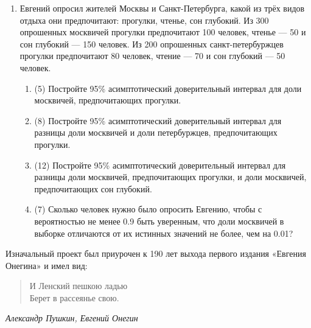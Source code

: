 \begin{enumerate}
\item  Евгений опросил жителей Москвы и Санкт-Петербурга,
  какой из трёх видов отдыха они предпочитают: прогулки, чтенье, сон глубокий. 
  Из 300 опрошенных москвичей прогулки предпочитают 100 человек, чтенье — 50 и сон глубокий — 150 человек.
  Из 200 опрошенных санкт-петербуржцев прогулки предпочитают 80 человек, чтение — 70 и сон глубокий — 50 человек. 
  
  \begin{enumerate}
      \item (5) Постройте 95\% асимптотический доверительный интервал для доли москвичей, предпочитающих прогулки. 
      \item (8) Постройте 95\% асимптотический доверительный интервал для разницы  доли москвичей и доли петербуржцев, предпочитающих прогулки.
      \item (12) Постройте 95\% асимптотический доверительный интервал для разницы  доли москвичей, предпочитающих прогулки, и 
      доли москвичей, предпочитающих сон глубокий.
      \item (7) Сколько человек нужно было опросить Евгению, чтобы с вероятностью не менее 0.9 быть уверенным, что доли москвичей в выборке отличаются от их истинных значений не более, чем на 0.01? 
  \end{enumerate}
  
\end{enumerate}


Изначальный проект был приурочен к 190 лет выхода первого издания «Евгения Онегина» и имел вид:
\vspace*{0.5cm}

\begin{minipage}{0.6\textwidth}
  \begin{quote}
      И Ленский пешкою ладью \\
      Берет в рассеянье свою. 
  \end{quote}
  \begin{flushright}
      \textit{Александр Пушкин, Евгений Онегин}
  \end{flushright}
  \end{minipage}
  
